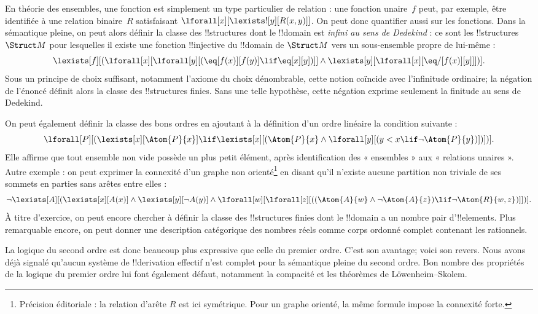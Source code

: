 \documentclass[../../../include/open-logic-section]{subfiles}
\begin{document}
En théorie des ensembles, une fonction est simplement un type
particulier de relation : une fonction unaire~$f$ peut, par exemple,
être identifiée à une relation binaire~$R$ satisfaisant
$\lforall[x][\lexists![y][R(x,y)]]$. On peut donc quantifier aussi
sur les fonctions. Dans la sémantique pleine, on peut alors définir
la classe des !!{structure}s dont le !!{domain} est
\emph{infini au sens de Dedekind} : ce sont les !!{structure}s
$\Struct M$ pour lesquelles il existe une fonction !!{injective}
du !!{domain} de $\Struct M$ vers un sous-ensemble propre de lui-même :
\[
\lexists[f][(\lforall[x][\lforall[y][(\eq[f(x)][f(y)] \lif \eq[x][y])]]
  \land \lexists[y][\lforall[x][\eq/[f(x)][y]]])].
\]
Sous un principe de choix suffisant, notamment l'axiome du choix
dénombrable, cette notion coïncide avec l'infinitude ordinaire; la
négation de l'énoncé définit alors la classe des !!{structure}s
finies. Sans une telle hypothèse, cette négation exprime seulement
la finitude au sens de Dedekind.

On peut également définir la classe des bons ordres en ajoutant à
la définition d'un ordre linéaire la condition suivante :
\[
\lforall[P][(\lexists[x][\Atom{P}{x}] \lif \lexists[x][(\Atom{P}{x}
    \land \lforall[y][(y < x \lif \lnot \Atom{P}{y})])])].
\]
Elle affirme que tout ensemble non vide possède un plus petit
élément, après identification des « ensembles » aux « relations
unaires ». Autre exemple : on peut exprimer la connexité d'un
graphe non orienté\footnote{Précision éditoriale : la relation d'arête $R$ est ici symétrique. Pour un graphe orienté, la même formule impose la connexité forte.} en disant qu'il n'existe aucune partition non triviale de ses
sommets en parties sans arêtes entre elles :
\[
\lnot \lexists[A][(\lexists[x][A(x)] \land \lexists[y][\lnot A(y)]
  \land \lforall[w][\lforall[z][((\Atom{A}{w} \land \lnot \Atom{A}{z})
      \lif \lnot \Atom{R}{w,z})]])].
\]
À titre d'exercice, on peut encore chercher à définir la classe
des !!{structure}s finies dont le !!{domain} a un nombre pair
d'!!{element}s. Plus remarquable encore, on peut donner une
description catégorique des nombres réels comme corps ordonné
complet contenant les rationnels.

La logique du second ordre est donc beaucoup plus expressive que
celle du premier ordre. C'est son avantage; voici son revers. Nous
avons déjà signalé qu'aucun système de !!{derivation} effectif
n'est complet pour la sémantique pleine du second ordre. Bon nombre
des propriétés de la logique du premier ordre lui font également
défaut, notamment la compacité et les théorèmes de
Löwenheim--Skolem.
\end{document}
